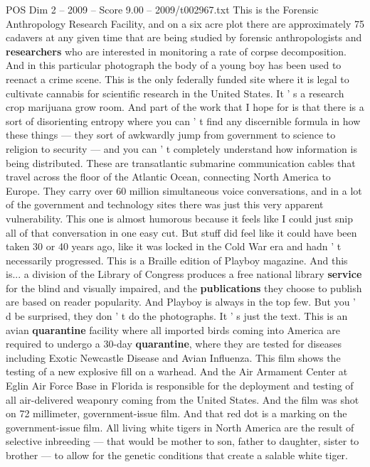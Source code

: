 \begin{textsample}{POS Dim 2 – 2009 – Score 9.00 – 2009/t002967.txt}
This is the Forensic Anthropology Research Facility, and on a six acre plot there are approximately 75 cadavers at any given time that are being studied by forensic anthropologists and \textbf{researchers} who are interested in monitoring a rate of corpse decomposition.
And in this particular photograph the body of a young boy has been used to reenact a crime scene.
This is the only federally funded site where it is legal to cultivate cannabis for scientific research in the United States.
It ' s a research crop marijuana grow room.
And part of the work that I hope for is that there is a sort of disorienting entropy where you can ' t find any discernible formula in how these things — they sort of awkwardly jump from government to science to religion to security — and you can ' t completely understand how information is being distributed.
These are transatlantic submarine communication cables that travel across the floor of the Atlantic Ocean, connecting North America to Europe.
They carry over 60 million simultaneous voice conversations, and in a lot of the government and technology sites there was just this very apparent vulnerability.
This one is almost humorous because it feels like I could just snip all of that conversation in one easy cut.
But stuff did feel like it could have been taken 30 or 40 years ago, like it was locked in the Cold War era and hadn ' t necessarily progressed.
This is a Braille edition of Playboy magazine.
And this is... a division of the Library of Congress produces a free national library \textbf{service} for the blind and visually impaired, and the \textbf{publications} they choose to publish are based on reader popularity.
And Playboy is always in the top few.
But you ' d be surprised, they don ' t do the photographs.
It ' s just the text.
This is an avian \textbf{quarantine} facility where all imported birds coming into America are required to undergo a 30-day \textbf{quarantine}, where they are tested for diseases including Exotic Newcastle Disease and Avian Influenza.
This film shows the testing of a new explosive fill on a warhead.
And the Air Armament Center at Eglin Air Force Base in Florida is responsible for the deployment and testing of all air-delivered weaponry coming from the United States.
And the film was shot on 72 millimeter, government-issue film.
And that red dot is a marking on the government-issue film.
All living white tigers in North America are the result of selective inbreeding — that would be mother to son, father to daughter, sister to brother — to allow for the genetic conditions that create a salable white tiger.

\end{textsample}
